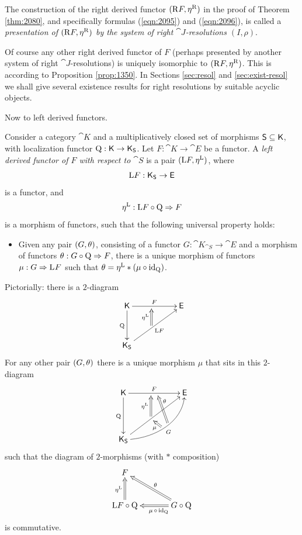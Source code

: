 \begin{dfn} \label{dfn:1350}
The construction of the right derived functor $(\mathrm{R} F, \eta^{\mathrm{R}})$ in 
the proof of Theorem \ref{thm:2080}, and specifically formulas (\ref{eqn:2095}) 
and (\ref{eqn:2096}), is called a {\em presentation of 
$(\mathrm{R} F, \eta^{\mathrm{R}})$ by the system of right $\cat{J}$-resolutions 
$(I, \rho)$}. 
\end{dfn}

Of course any other right derived functor of $F$ (perhaps presented  
by another system of right $\cat{J}$-resolutions) is uniquely isomorphic to 
$(\mathrm{R} F, \eta^{\mathrm{R}})$. This is according to Proposition 
\ref{prop:1350}. In Sections \ref{sec:resol} and \ref{sec:exist-resol} we shall 
give several existence results for right resolutions by suitable acyclic 
objects. 

Now to left derived functors. 

\begin{dfn} \label{dfn:2090}
Consider a category $\cat{K}$ and a multiplicatively closed set of morphisms 
$\operatorname{\mathsf{S}} \subseteq \operatorname{\mathsf{K}}$, with localization functor 
$\operatorname{Q} : \operatorname{\mathsf{K}} \to \operatorname{\mathsf{K}}_{\operatorname{\mathsf{S}}}$. 
Let $F : \cat{K} \to \cat{E}$ be a functor. A
{\em left derived functor of $F$ with respect to $\cat{S}$} 
is a pair $(\mathrm{L} F, \eta^{\mathrm{L}})$, where 
\[ \mathrm{L} F : \operatorname{\mathsf{K}}_{\operatorname{\mathsf{S}}} \to \operatorname{\mathsf{E}} \]
is a functor, and 
\[ \eta^{\mathrm{L}} : \mathrm{L} F \circ \operatorname{Q} \Rightarrow F \] 
is a morphism of functors, such that the following universal property holds:
\begin{itemize}
\item[(L)] Given any pair $(G, \theta)$, consisting of a functor
$G : \cat{K}_{\cat{S}} \to \cat{E}$ 
and a morphism of functors 
$\theta : G \circ \operatorname{Q} \Rightarrow F$,
there is a unique morphism of functors 
$\mu : G  \Rightarrow \mathrm{L}^{} F$
such that 
$\theta = \eta^{\mathrm{L}} * (\mu \circ \operatorname{id}_{\operatorname{Q}})$.
\end{itemize}
\end{dfn}

Pictorially: there is a $2$-diagram 
\[ \UseTips  \xymatrix @C=12ex @R=8ex  {
\cat{K}
\ar[r]^{F} _(0.45){}="q" 
\ar[d]_{\opn{Q}}
& 
\cat{E} 
\\
\cat{K}_{\cat{S}}
\ar[ur]_{\mrm{L} F} ^(0.45){}="f"
\ar@{=>}  "f";"q" ^{\eta^{\mrm{L}}}
} \]
For any other pair $(G, \theta)$ there is a unique morphism $\mu$ that sits in 
this $2$-diagram
\[ \UseTips  \xymatrix @C=14ex @R=10ex {
\cat{K}
\ar[r]^{F} _(0.45){}="q"  ^(0.55){}="q2" 
\ar[d]_{\opn{Q}}
& 
\cat{E} 
\\
\cat{K}_{\cat{S}}
\ar[ur] ^(0.45){}="f" ^(0.5){}="f1" 
\ar@{=>}  "f";"q" ^{\eta^{\mrm{L}}}
\ar@(r,d)[ru]_{G} ^(0.55){}="g"  ^(0.48){}="g1"
\ar@{=>}  "g";"q2" _(0.7){\th}
\ar@{=>}  "g1";"f" ^(0.45){\mu}
} \]
such that the diagram of $2$-morphisms (with $*$ composition) 
\[ \UseTips \xymatrix @C=8ex @R=6ex { 
F
&
\\
\mrm{L} F \circ \opn{Q}
\ar@{=>}[u]^{\eta^{\mrm{L}}}
&
G \circ \opn{Q}
\ar@{=>}[ul]_{\th}
\ar@{=>}[l]^(0.4){\mu \, \circ \, \opn{id}_{\opn{Q}}}
} \]
is commutative. 

